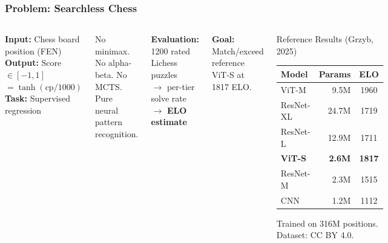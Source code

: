 \documentclass{beamer}
\begin{document}
\begin{frame}
\frametitle{Problem: Searchless Chess}

\begin{columns}

\textbf{Input:} Chess board position (FEN)\\
\textbf{Output:} Score $\in [-1, 1]$ $= \tanh(\text{cp}/1000)$\\
\textbf{Task:} Supervised regression

\vspace{0.7em}
No minimax. No alpha-beta. No MCTS.\\
\alert{Pure neural pattern recognition.}

\vspace{0.7em}
\textbf{Evaluation:} 1200 rated Lichess puzzles\\
\quad$\rightarrow$ per-tier solve rate $\rightarrow$ \textbf{ELO estimate}

\vspace{0.7em}
\textbf{Goal:} Match/exceed reference ViT-S at 1817 ELO.

\begin{block}{Reference Results (Grzyb, 2025)}
\footnotesize
\begin{tabular}{lrc}
\toprule
\textbf{Model} & \textbf{Params} & \textbf{ELO} \\
\midrule
ViT-M     & 9.5M  & 1960 \\
ResNet-XL & 24.7M & 1719 \\
ResNet-L  & 12.9M & 1711 \\
\textbf{ViT-S}     & \textbf{2.6M}  & \textbf{1817} \\
ResNet-M  & 2.3M  & 1515 \\
CNN       & 1.2M  & 1112 \\
\bottomrule
\end{tabular}

\vspace{0.3em}
{\tiny Trained on 316M positions. Dataset: CC BY 4.0.}
\end{block}
\end{columns}

\end{frame}
\end{document}
